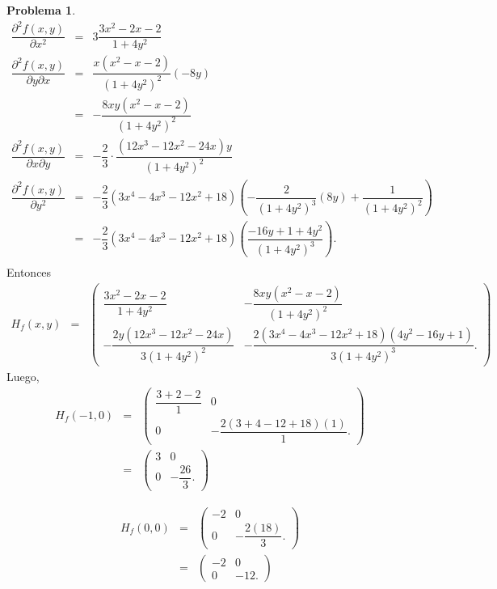 \documentclass[12pt,letterpaper]{article}
\theoremstyle{definition}
\newtheorem{problm}{Problema}
\begin{document}
\begin{problm}
	\begin{eqnarray*}
		\dfrac{\partial^2 f(x,y) }{\partial x^2} & = & 3\dfrac{3x^2 - 2x -2}{1+4y^2} \\
		\dfrac{\partial^2 f(x,y) }{\partial y \partial x} & = & \dfrac{x(x^2 -x-2)}{(1+4y^2)^2} (-8y) \\
												 & = & -\dfrac{8xy(x^2 -x-2)}{(1+4y^2)^2} \\
		\dfrac{\partial^2 f(x,y) }{\partial x \partial y} & = & -\dfrac{2}{3} \cdot \dfrac{(12x^3 - 12x^2 -24x)y}{(1+4y^2)^2} \\
		\dfrac{\partial^2 f(x,y) }{\partial y^2} & = & -\dfrac{2}{3}(3x^4 - 4x^3 - 12x^2 + 18) \left( - \dfrac{2}{(1+4y^2)^3} (8y) + \dfrac{1}{(1+4y^2)^2}  \right) \\
		& = & -\dfrac{2}{3}(3x^4 - 4x^3 - 12x^2 + 18) \left( \dfrac{-16y +1 +4y^2}{(1+4y^2)^3} \right). \\									 
	\end{eqnarray*}
	Entonces
	\begin{eqnarray*}
		H_f(x,y) & = & \left(\begin{matrix}
							\dfrac{3x^2 - 2x -2}{1+4y^2} & -\dfrac{8xy(x^2 -x-2)}{(1+4y^2)^2} \\
							-\dfrac{2y(12x^3 - 12x^2 -24x)}{3(1+4y^2)^2} & 
							-\dfrac{2 (3x^4 - 4x^3 - 12x^2 + 18)(4y^2 - 16y + 1) }{3(1+4y^2)^3}.
		\end{matrix}\right)
	\end{eqnarray*}
	Luego,
	\begin{eqnarray*}
		H_f(-1,0) & = & \left(\begin{matrix}
			\dfrac{3+2-2}{1} & 0 \\
			0 & 
			-\dfrac{2 (3 + 4 - 12 + 18)(1) }{1}.
		\end{matrix}\right) \\
				  & = & \left(\begin{matrix}
				  	3 & 0 \\
				  	0 & 
				  	-\dfrac{26}{3}.
				  \end{matrix}\right)
	\end{eqnarray*}

	\begin{eqnarray*}
		H_f(0,0) & = & \left(\begin{matrix}
			-2 & 0 \\
			0 & 
			-\dfrac{2 (18)}{3}.
		\end{matrix}\right) \\
		& = & \left(\begin{matrix}
			-2 & 0 \\
			0 & 
			-12.
		\end{matrix}\right)
	\end{eqnarray*}


\end{problm}
\end{document}
